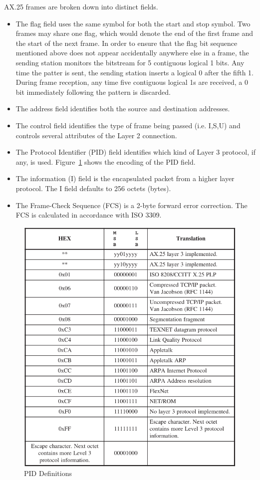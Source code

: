 \documentclass[letter,12pt]{article}
\begin{document}
		AX.25 frames are broken down into distinct fields.
		\begin{itemize}
			\item The flag field uses the same symbol for both the start and stop symbol.  Two frames may share one flag, which would denote the end of the first frame and the start of the next frame.  In order to ensure that the flag bit sequence mentioned above does not appear accidentally anywhere else in a frame, the sending station monitors the bitstream for 5 contiguous logical 1 bits.  Any time the patter is sent, the sending station inserts a logical 0 after the fifth 1.  During frame reception, any time five contiguous logical 1s are received, a 0 bit immediately following the pattern is discarded.
			\item The address field identifies both the source and destination addresses. 
			\item The control field identifies the type of frame being passed (i.e. I,S,U) and controls several attributes of the Layer 2 connection.
			\item The Protocol Identifier (PID) field identifies which kind of Layer 3 protocol, if any, is used. Figure~\ref{fig:AX25_PID_Definitions} shows the encoding of the PID field.
			\item The information (I) field is the encapsulated packet from a higher layer protocol.  The I field defaults to 256 octets (bytes).
			\item The Frame-Check Sequence (FCS) is a 2-byte forward error correction. The FCS is calculated in accordance with ISO 3309.
		\end{itemize}
		
		\begin{figure}[h!]
			\centering
			\includegraphics[width=.7\textwidth]{./PNGs/AX25_PID_Definitions.png}
			\caption{PID Definitions \cite{Beech_98}}
			\label{fig:AX25_PID_Definitions}			
		\end{figure}
		
\end{document}

